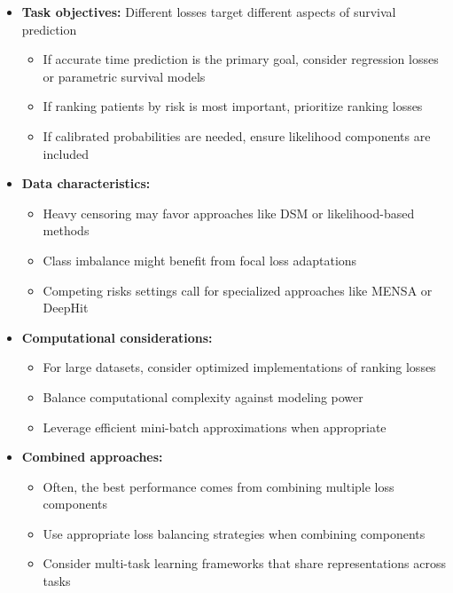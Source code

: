 \begin{itemize}
\item \textbf{Task objectives:} Different losses target different aspects of survival prediction
  \begin{itemize}
  \item If accurate time prediction is the primary goal, consider regression losses or parametric survival models
  \item If ranking patients by risk is most important, prioritize ranking losses
  \item If calibrated probabilities are needed, ensure likelihood components are included
  \end{itemize}

\item \textbf{Data characteristics:}
  \begin{itemize}
  \item Heavy censoring may favor approaches like DSM or likelihood-based methods
  \item Class imbalance might benefit from focal loss adaptations
  \item Competing risks settings call for specialized approaches like MENSA or DeepHit
  \end{itemize}

\item \textbf{Computational considerations:}
  \begin{itemize}
  \item For large datasets, consider optimized implementations of ranking losses
  \item Balance computational complexity against modeling power
  \item Leverage efficient mini-batch approximations when appropriate
  \end{itemize}

\item \textbf{Combined approaches:}
  \begin{itemize}
  \item Often, the best performance comes from combining multiple loss components
  \item Use appropriate loss balancing strategies when combining components
  \item Consider multi-task learning frameworks that share representations across tasks
  \end{itemize}
\end{itemize}
